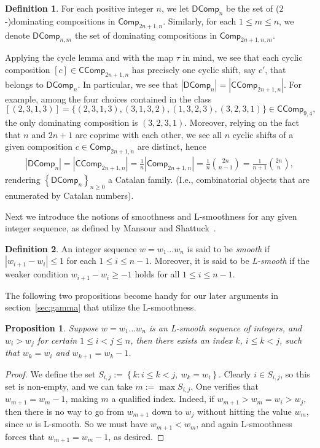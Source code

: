 \documentclass[reqno]{amsart}
\numberwithin{equation}{section}
\newtheorem{proposition}[theorem]{Proposition}
\theoremstyle{definition}
\newtheorem{definition}{Definition}[section]
\theoremstyle{named}
\newcommand{\abs}[1]{\left|#1\right|}
\newcommand{\set}[1]{\left\{#1\right\}}
\def\Comp{\mathsf{Comp}}
\def\CComp{\mathsf{CComp}}
\def\DComp{\mathsf{DComp}}
\begin{document}
\begin{definition}
For each positive integer $n$, we let $\DComp_n$ be the set of ($2$-)dominating compositions in $\Comp_{2n+1,n}$. Similarly, for each $1\le m\le n$, we denote $\DComp_{n,m}$ the set of dominating compositions in $\Comp_{2n+1,n,m}$.
\end{definition}

Applying the cycle lemma and with the map $\tau$ in mind, we see that each cyclic composition $[c]\in\CComp_{2n+1,n}$ has precisely one cyclic shift, say $c'$, that belongs to $\DComp_n$. In particular, we see that $|\DComp_n|=|\CComp_{2n+1,n}|$. For example, among the four choices contained in the class
$$[(2,3,1,3)]=\{(2,3,1,3),(3,1,3,2),(1,3,2,3),(3,2,3,1)\}\in\CComp_{9,4},$$
the only dominating composition is $(3,2,3,1)$. Moreover, relying on the fact that $n$ and $2n+1$ are coprime with each other, we see all $n$ cyclic shifts of a given composition $c\in\Comp_{2n+1,n}$ are distinct, hence
\begin{align*} 
\abs{\DComp_n}=\abs{\CComp_{2n+1,n}}=\frac{1}{n}\abs{\Comp_{2n+1,n}}=\frac{1}{n}\binom{2n}{n-1}=\frac{1}{n+1}\binom{2n}{n},
\end{align*}
rendering $\set{\DComp_n}_{n\ge 0}$ a Catalan family. (I.e., combinatorial objects that are enumerated by Catalan numbers).

Next we introduce the notions of smoothness and L-smoothness for any given integer sequence, as defined by Mansour and Shattuck~\cite{MS2023}.
\begin{definition}
An integer sequence $w=w_1\ldots w_n$ is said to be {\it smooth} if $|w_{i+1}-w_i|\le 1$ for each $1\le i\le n-1$. Moreover, it is said to be {\it L-smooth} if the weaker condition $w_{i+1}-w_i\ge -1$ holds for all $1\le i\le n-1$.
\end{definition}
The following two propositions become handy for our later arguments in section~\ref{sec:gamma} that utilize the L-smoothness.
\begin{proposition}\label{down-by-one}
Suppose $w=w_1\ldots w_n$ is an L-smooth sequence of integers, and $w_i>w_j$ for certain $1\le i<j\le n$, then there exists an index $k$, $i\le k<j$, such that $w_k=w_i$ and $w_{k+1}=w_k-1$.
\end{proposition}
\begin{proof}
We define the set $S_{i,j}:=\set{k:i\le k<j,~w_k=w_i}$. Clearly $i\in S_{i,j}$, so this set is non-empty, and we can take $m:=\max{S_{i,j}}$. One verifies that $w_{m+1}=w_m-1$, making $m$ a qualified index. Indeed, if $w_{m+1}>w_m=w_i>w_j$, then there is no way to go from $w_{m+1}$ down to $w_j$ without hitting the value $w_m$, since $w$ is L-smooth. So we must have $w_{m+1}<w_m$, and again L-smoothness forces that $w_{m+1}=w_m-1$, as desired.
\end{proof}
\end{document}
